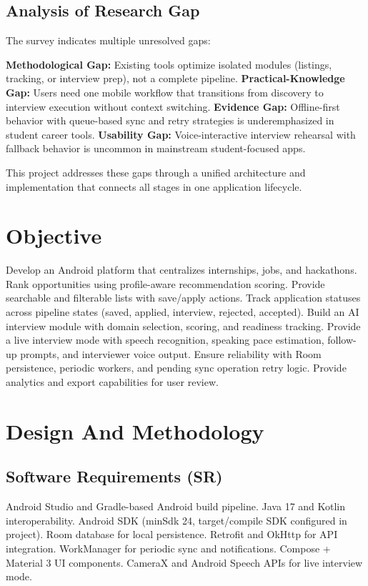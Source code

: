 \documentclass[conference]{IEEEtran}
\begin{document}
\subsection{Analysis of Research Gap}

The survey indicates multiple unresolved gaps:

\textbf{Methodological Gap:} Existing tools optimize isolated modules (listings, tracking, or interview prep), not a complete pipeline. \textbf{Practical-Knowledge Gap:} Users need one mobile workflow that transitions from discovery to interview execution without context switching. \textbf{Evidence Gap:} Offline-first behavior with queue-based sync and retry strategies is underemphasized in student career tools. \textbf{Usability Gap:} Voice-interactive interview rehearsal with fallback behavior is uncommon in mainstream student-focused apps.

This project addresses these gaps through a unified architecture and implementation that connects all stages in one application lifecycle.

\section{Objective}

Develop an Android platform that centralizes internships, jobs, and hackathons. Rank opportunities using profile-aware recommendation scoring. Provide searchable and filterable lists with save/apply actions. Track application statuses across pipeline states (saved, applied, interview, rejected, accepted). Build an AI interview module with domain selection, scoring, and readiness tracking. Provide a live interview mode with speech recognition, speaking pace estimation, follow-up prompts, and interviewer voice output. Ensure reliability with Room persistence, periodic workers, and pending sync operation retry logic. Provide analytics and export capabilities for user review.

\section{Design And Methodology}

\subsection{Software Requirements (SR)}

Android Studio and Gradle-based Android build pipeline. Java 17 and Kotlin interoperability. Android SDK (minSdk 24, target/compile SDK configured in project). Room database for local persistence. Retrofit and OkHttp for API integration. WorkManager for periodic sync and notifications. Compose + Material 3 UI components. CameraX and Android Speech APIs for live interview mode.
\end{document}
